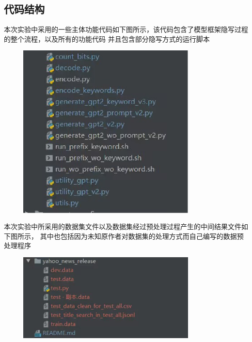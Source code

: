 \documentclass[a4paper,11pt,UTF8]{ctexart}
\newcommand{\bottomcaption}{%
\setlength{\abovecaptionskip}{6pt}%
\setlength{\belowcaptionskip}{6pt}%
\caption}
\newcommand{\xiaowuhao}{\fontsize{9pt}{\baselineskip}\selectfont}   %
\begin{document}
  \subsection{代码结构}
    本次实验中采用的一些主体功能代码如下图所示，该代码包含了模型框架隐写过程的整个流程，以及所有的功能代码
    并且包含部分隐写方式的运行脚本
    \begin{figure}[H]
      \centering
      \includegraphics[width=9cm]{代码结构1.png}
      \bottomcaption{\xiaowuhao{代码结构}}
    \end{figure}

    本次实验中所采用的数据集文件以及数据集经过预处理过程产生的中间结果文件如下图所示，
    其中也包括因为未知原作者对数据集的处理方式而自己编写的数据预处理程序
    \begin{figure}[H]
      \centering
      \includegraphics[width=9cm]{代码结构2.png}
      \bottomcaption{\xiaowuhao{代码结构}}
    \end{figure}
\end{document}
